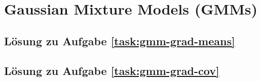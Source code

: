 \section{Gaussian Mixture Models (GMMs)}

\subsection*{Lösung zu Aufgabe \ref{task:gmm-grad-means}}


\subsection*{Lösung zu Aufgabe \ref{task:gmm-grad-cov}}




\newpage